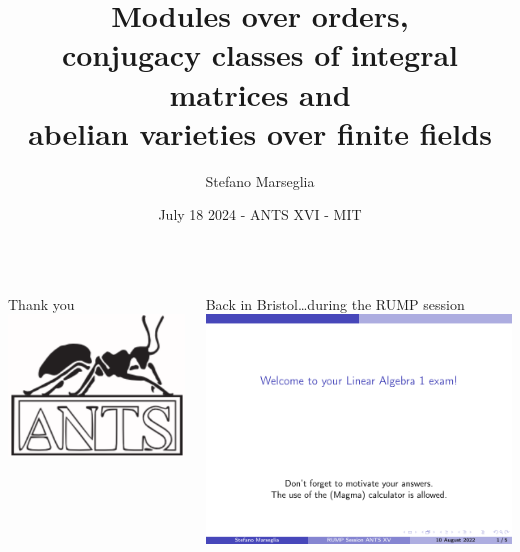 \documentclass[aspectratio=169,usenames,dvipsnames]{beamer}
\title[ANTS XVI - MIT]{Modules over orders,\\conjugacy classes of integral matrices and\\ abelian varieties over finite fields}
\subtitle{}
\author[Stefano Marseglia]{Stefano Marseglia}
\institute[UPF]{University of French Polynesia}
\date[July 18 2024]{July 18 2024 - ANTS XVI - MIT}
\begin{document}
\begin{frame}{}
   \maketitle
\end{frame}

\begin{frame}{}
   \begin{columns}
      \begin{column}{0.5\textwidth}
         {\Huge Thank you} \includegraphics[scale=0.5]{ants.PNG}
      \end{column}
      \pause
      \begin{column}{0.5\textwidth}  %
          \begin{center}
            Back in Bristol\dots during the RUMP session\vspace*{2em}
            \includegraphics[scale=0.5]{back_in_Bristol.pdf}

\end{center}
\end{column}
\end{columns}
\end{frame}
\end{document}
